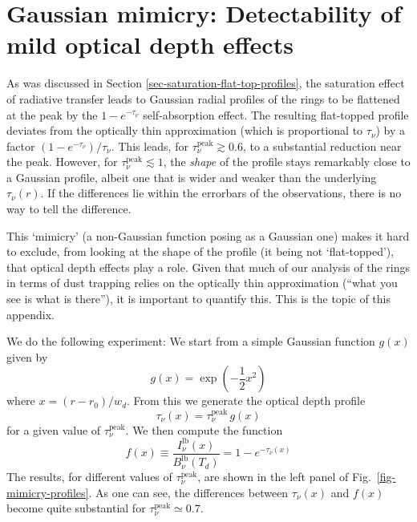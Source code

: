 \documentclass{aa}
\begin{document}
\section{Gaussian mimicry: Detectability of mild optical depth effects}
\label{sec-mimicry-flat-topped}
%
As was discussed in Section \ref{sec-saturation-flat-top-profiles}, the
saturation effect of radiative transfer leads to Gaussian radial profiles of the
rings to be flattened at the peak by the $1-e^{-\tau_\nu}$ self-absorption
effect. The resulting flat-topped profile deviates from the optically thin
approximation (which is proportional to $\tau_\nu$) by a factor
$(1-e^{-\tau_\nu})/\tau_\nu$. This leads, for $\tau_\nu^{\mathrm{peak}}\gtrsim
0.6$, to a substantial reduction near the peak. However, for
$\tau_\nu^{\mathrm{peak}}\lesssim 1$, the {\em shape} of the profile stays
remarkably close to a Gaussian profile, albeit one that is wider and weaker than
the underlying $\tau_\nu(r)$. If the differences lie within the errorbars of the
observations, there is no way to tell the difference.

This `mimicry' (a non-Gaussian function posing as a Gaussian one) makes it hard
to exclude, from looking at the shape of the profile (it being not
`flat-topped'), that optical depth effects play a role. Given that much of our
analysis of the rings in terms of dust trapping relies on the optically thin
approximation (``what you see is what is there''), it is important to
quantify this. This is the topic of this appendix.

We do the following experiment: We start from a simple Gaussian function
$g(x)$ given by
\begin{equation}\label{eq-mimicry-underlying-gauss}
g(x) = \exp\left(-\frac{1}{2}x^2\right)
\end{equation}
where $x=(r-r_0)/w_d$. From this we generate the optical depth profile
\begin{equation}
\tau_\nu(x) = \tau_\nu^{\mathrm{peak}}\,g(x)
\end{equation}
for a given value of $\tau_\nu^{\mathrm{peak}}$. We then compute the function
\begin{equation}
  f(x) \equiv \frac{I_\nu^{\mathrm{lb}}(x)}{B_\nu^{\mathrm{lb}}(T_d)}
  = 1-e^{-\tau_\nu(x)}
\end{equation}
The results, for different values of $\tau_\nu^{\mathrm{peak}}$, are shown in
the left panel of Fig.~\ref{fig-mimicry-profiles}. As one can see, the
differences between $\tau_\nu(x)$ and $f(x)$ become quite substantial for
$\tau_\nu^{\mathrm{peak}}\simeq 0.7$.
\end{document}
